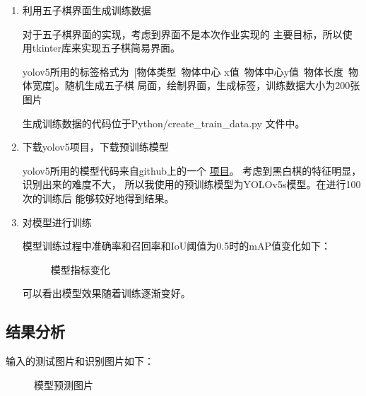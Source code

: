 \documentclass[UTF8]{article}
\begin{document}
\begin{enumerate}
    \item 利用五子棋界面生成训练数据
    
    \subitem 对于五子棋界面的实现，考虑到界面不是本次作业实现的
    主要目标，所以使用tkinter库来实现五子棋简易界面。

    \subitem yolov5所用的标签格式为\ [物体类型\ 物体中心
    x值\ 物体中心y值\ 物体长度\ 物体宽度]。随机生成五子棋
    局面，绘制界面，生成标签，训练数据大小为200张图片

    \subitem 生成训练数据的代码位于Python/create\_train\_data.py
    文件中。
    
    \item 下载yolov5项目，下载预训练模型
    
    \subitem yolov5所用的模型代码来自github上的一个
    \href{https://github.com/ultralytics/yolov5}{项目}。
    考虑到黑白棋的特征明显，识别出来的难度不大，
    所以我使用的预训练模型为YOLOv5s模型。在进行100次的训练后
    能够较好地得到结果。

    \item 对模型进行训练
    
    \subitem 模型训练过程中准确率和召回率和IoU阈值为0.5时的mAP值变化如下：

    \begin{figure}[H]
        \centering
        \caption{模型指标变化}
    \end{figure}
    
    \subitem 可以看出模型效果随着训练逐渐变好。    

\end{enumerate}

\subsection{结果分析}

输入的测试图片和识别图片如下：
 
    \begin{figure}[H]
            \centering
            \caption{模型预测图片}
            
    \end{figure}
\end{document}
